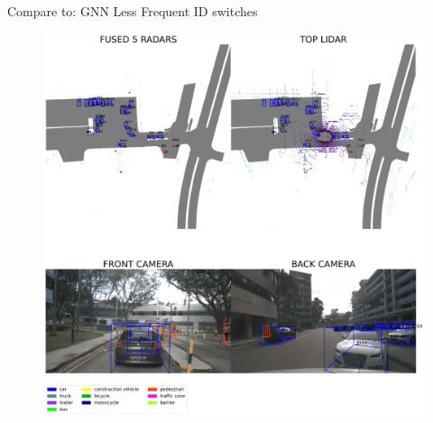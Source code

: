 \documentclass[aspectratio=169,xcolor=dvipsnames]{beamer}
\begin{document}
\begin{frame}{Compare to: GNN Less Frequent ID switches}
    \begin{figure}
    \includegraphics[width=0.5\linewidth]{GNN/3.png}
    \end{figure}
\end{frame}
\end{document}
